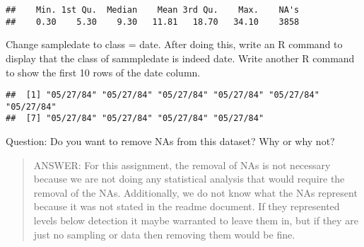 \documentclass[]{article}
\newenvironment{Shaded}{\begin{snugshade}}{\end{snugshade}}
\newcommand{\KeywordTok}[1]{\textcolor[rgb]{0.13,0.29,0.53}{\textbf{#1}}}
\newcommand{\DataTypeTok}[1]{\textcolor[rgb]{0.13,0.29,0.53}{#1}}
\newcommand{\DecValTok}[1]{\textcolor[rgb]{0.00,0.00,0.81}{#1}}
\newcommand{\StringTok}[1]{\textcolor[rgb]{0.31,0.60,0.02}{#1}}
\newcommand{\CommentTok}[1]{\textcolor[rgb]{0.56,0.35,0.01}{\textit{#1}}}
\newcommand{\OperatorTok}[1]{\textcolor[rgb]{0.81,0.36,0.00}{\textbf{#1}}}
\newcommand{\NormalTok}[1]{#1}
\begin{document}
\begin{Shaded}
\end{Shaded}

\begin{verbatim}
##    Min. 1st Qu.  Median    Mean 3rd Qu.    Max.    NA's 
##    0.30    5.30    9.30   11.81   18.70   34.10    3858
\end{verbatim}

Change sampledate to class = date. After doing this, write an R command
to display that the class of sammpledate is indeed date. Write another R
command to show the first 10 rows of the date column.

\begin{Shaded}
\end{Shaded}

\begin{verbatim}
##  [1] "05/27/84" "05/27/84" "05/27/84" "05/27/84" "05/27/84" "05/27/84"
##  [7] "05/27/84" "05/27/84" "05/27/84" "05/27/84"
\end{verbatim}

Question: Do you want to remove NAs from this dataset? Why or why not?

\begin{quote}
ANSWER: For this assignment, the removal of NAs is not necessary because
we are not doing any statistical analysis that would require the removal
of the NAs. Additionally, we do not know what the NAs represent because
it was not stated in the readme document. If they represented levels
below detection it maybe warranted to leave them in, but if they are
just no sampling or data then removing them would be fine.
\end{quote}
\end{document}
